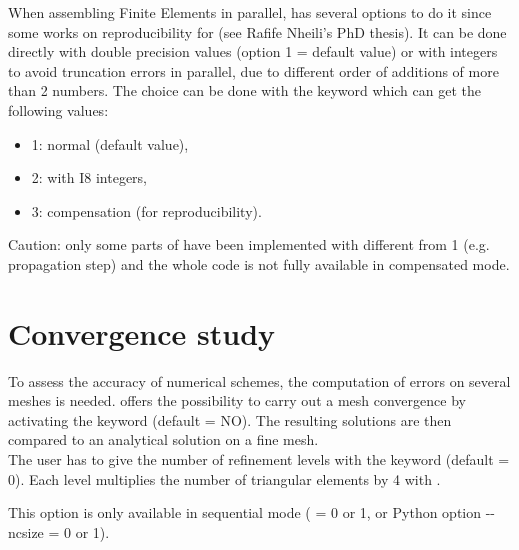 When assembling Finite Elements in parallel,  has several options
to do it since some works on reproducibility for \tel
(see Rafife Nheili's PhD thesis).
It can be done directly with double precision values
(option 1 = default value)
or with integers to avoid truncation errors in parallel, due to different
order of additions of more than 2 numbers.
The choice can be done with the keyword 
which can get the following values:
\begin{itemize}
\item 1: normal (default value),
\item 2: with I8 integers,
\item 3: compensation (for reproducibility).
\end{itemize}
Caution: only some parts of  have been implemented
with  different from 1
(e.g. propagation step) and the whole code is not fully available
in compensated mode.


\section{Convergence study}

To assess the accuracy of numerical schemes, the computation of errors
on several meshes is needed.
 offers the possibility to carry out a mesh convergence
by activating the keyword  (default = NO).
The resulting solutions are then compared to an analytical solution
on a fine mesh.\\

The user has to give the number of refinement levels with the keyword
 (default = 0).
Each level multiplies the number of triangular elements by 4 with \stbtel.

This option is only available in sequential mode
( = 0 or 1, or Python option -{}-ncsize = 0 or 1).
